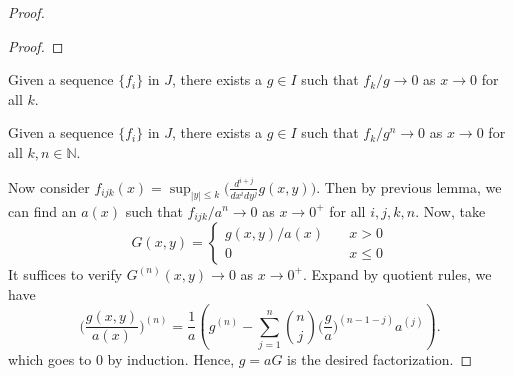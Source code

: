 \documentclass[10pt,a4paper]{amsart}
\newcommand{\N}{{\mathbb{N}}}
\begin{document}
\begin{proof}
\begin{proof}
 	
% 			
% 			
% 			
 			\end{proof}
 		\begin{cor}
 			Given a sequence $\{f_i\}$ in $J$, there exists a $g\in I$ such that $f_k/g \to 0$ as $x \to 0$ for all $k$.
 		\end{cor}
 	
 		\begin{cor}
 		Given a sequence $\{f_i\}$ in $J$, there exists a $g\in I$ such that $f_k/g^n \to 0$ as $x \to 0$ for all $k, n \in \N$.
 	\end{cor}
 
 Now consider $f_{ijk}(x) = \sup_{|y| \le k}\big(\frac{d^{i+j}}{dx^i dy^j}g(x,y)\big)$. Then by previous lemma, we can find an $a(x)$ such that $f_{ijk}/a^n \to 0$ as $x \to 0^+$ for all $i, j, k, n$. Now, take $$G(x, y)= \begin{cases}
                   g(x,y)/a(x)\quad & x >0\\
                   0 & x\le 0
            \end{cases}
 $$
 It suffices to verify $G^{(n)}(x,y)\to 0$ as $x\to 0^+$. Expand by quotient rules, we have
 $$
  			\bigg(\frac{g(x,y)}{a(x)}\bigg)^{(n)} =   \frac{1}{a} \left( g^{(n)} -\sum_{j=1}^{n} \binom{n}{j} \bigg(\frac{g}{a}\bigg)^{(n-1-j)}a^{(j)} \right).
 			$$
which goes to $0$ by induction. Hence, $g=aG$ is the desired factorization.                                                                                                                                                                                                                                                                                                                                                                                                                                                                                                                                                                                                          
 
\end{proof}
\end{document}
